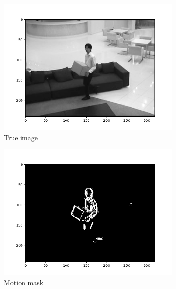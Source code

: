 \begin{figure}[!ht]
    \centering
    \begin{subfigure}{.3\textwidth}
        \includegraphics[width=\textwidth]{sofa_frame_100.png}
        \caption{True image}
    \end{subfigure}
    \hfill
    \begin{subfigure}{.3\textwidth}
        \includegraphics[width=\textwidth]{sofa_motion_frame_100.png}
        \caption{Motion mask}
    \end{subfigure}
    \hfill
    \begin{subfigure}{.3\textwidth}

\end{subfigure}
\end{figure}
